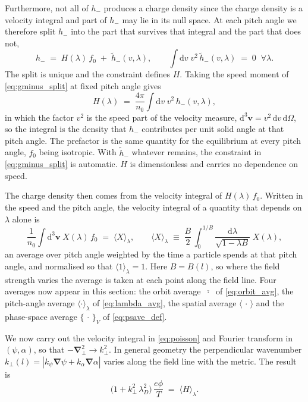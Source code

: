 \documentclass{jpp}
\newcommand{\rmd}{\text{d}}
\newcommand{\bv}{\mathbf{v}}
\renewcommand{\vec}[1]{\boldsymbol{#1}}
\newcommand{\vec}[1]{\boldsymbol{#1}}
\newcommand{\grad}{{\vec{\nabla}}}
\newcommand{\kperp}{k_\perp}
\newcommand{\lambdaD}{\lambda_D}
\newcommand{\lavg}[1]{\langle #1 \rangle_\lambda}
\begin{document}
Furthermore, not all of $h_-$ produces a charge density since the charge density is a velocity integral and part of $h_-$ may lie in its null space. At each pitch angle we therefore split $h_-$ into the part that survives that integral and the part that does not,
\begin{equation}\label{eq:gminus_split}
h_- \;=\; H(\lambda)\, f_0 \;+\; \tilde h_-(v,\lambda),
\qquad \int \rmd v\; v^2\, \tilde h_-(v,\lambda) \;=\; 0 \;\;\forall\lambda .
\end{equation}
The split is unique and the constraint defines $H$. Taking the speed moment of \cref{eq:gminus_split} at fixed pitch angle gives
\begin{equation}\label{eq:H_def}
H(\lambda) \;=\; \frac{4\pi}{n_0}\int \rmd v\; v^2\, h_-(v, \lambda) ,
\end{equation}
in which the factor $v^2$ is the speed part of the velocity measure, $\rmd^3\bv = v^2\, \rmd v\, \rmd\Omega$, so the integral is the density that $h_-$ contributes per unit solid angle at that pitch angle. The prefactor is the same quantity for the equilibrium at every pitch angle, $f_0$ being isotropic. With $\tilde h_-$ whatever remains, the constraint in \cref{eq:gminus_split} is automatic. $H$ is dimensionless and carries no dependence on speed.

The charge density then comes from the velocity integral of $H(\lambda)\, f_0$. Written in the speed and the pitch angle, the velocity integral of a quantity that depends on $\lambda$ alone is
\begin{equation}\label{eq:lambda_avg}
\frac{1}{n_0}\int \rmd^3\bv\; X(\lambda)\, f_0 \;=\; \lavg{X},
\qquad
\lavg{X} \;\equiv\; \frac{B}{2}\,\int_0^{1/B}\!\frac{\rmd\lambda}{\sqrt{1 - \lambda B}}\; X(\lambda) ,
\end{equation}
an average over pitch angle weighted by the time a particle spends at that pitch angle, and normalised so that $\lavg{1} = 1$. Here $B = B(l)$, so where the field strength varies the average is taken at each point along the field line. Four averages now appear in this section: the orbit average $\overline{\;\cdot\;}$ of \cref{eq:orbit_avg}, the pitch-angle average $\lavg{\cdot}$ of \cref{eq:lambda_avg}, the spatial average $\langle\,\cdot\,\rangle$ and the phase-space average $\{\,\cdot\,\}_{\scriptscriptstyle V}$ of \cref{eq:psave_def}.

We now carry out the velocity integral in \cref{eq:poisson} and Fourier transform in $(\psi,\alpha)$, so that $-\grad_\perp^2 \to \kperp^2$. In general geometry the perpendicular wavenumber $\kperp(l) = |k_\psi\grad\psi + k_\alpha\grad\alpha|$ varies along the field line with the metric. The result is
\begin{equation}\label{eq:poisson_G}
\bigl(1 + \kperp^2\,\lambdaD^2\bigr)\,\frac{e\phi}{T}
\;=\; \lavg{H} .
\end{equation}
\end{document}
